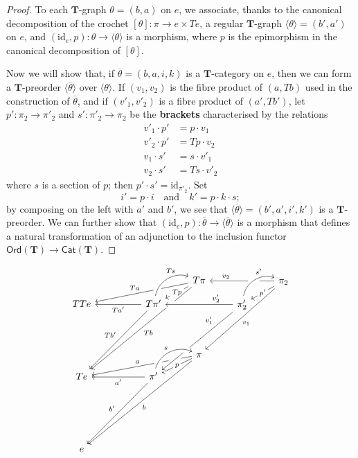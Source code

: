 \documentclass[fleqn]{article}
\newcommand{\oldpage}[1]{\marginpar{\footnotesize$\Big\vert$ \textit{p.~#1}}}
\newcommand{\unsure}[1]{{\color{purple}\textbf{#1}}}
\newcommand{\id}{\mathrm{id}}
\newcommand{\TT}{\mathbf{T}}
\newcommand{\textand}{\quad\text{and}\quad}
\newcommand{\Cat}[1]{\mathsf{#1}}
\newcommand{\Ord}[1]{\Cat{Ord}(#1)}
\begin{document}
\begin{proof}
  To each $\TT$-graph $\theta=(b,a)$ on $e$, we associate, thanks to the canonical decomposition of the crochet $[\theta]\colon\pi\to e\times Te$, a regular $\TT$-graph $\langle\theta\rangle=(b',a')$ on $e$, and $(\id_e,p)\colon\theta\to\langle\theta\rangle$ is a morphism, where $p$ is the epimorphism in the canonical decomposition of $[\theta]$.

  Now we will show that, if $\overline{\theta}=(b,a,i,k)$ is a $\TT$-category on $e$, then we can form a $\TT$-preorder $\langle\overline{\theta}\rangle$ over $\langle\theta\rangle$.
  If $(v_1,v_2)$ is the fibre product of $(a,Tb)$ used in the construction of $\overline{\theta}$, and if $(v'_1,v'_2)$ is a fibre product of $(a',Tb')$, let $p'\colon\pi_2\to\pi'_2$ and $s'\colon\pi'_2\to\pi_2$ be the \unsure{brackets} characterised by the relations
  \[
    \begin{aligned}
      v'_1\cdot p'
    & = p\cdot v_1
    \\v'_2\cdot p'
    & = Tp\cdot v_2
    \\v_1\cdot s'
    & = s\cdot v'_1
    \\v_2\cdot s'
    & = Ts\cdot v'_2
    \end{aligned}
  \]
  where $s$ is a section of $p$;
  then $p'\cdot s'=\id_{\pi'_2}$.
  Set
  \[
    i' = p\cdot i
    \textand
    k' = p\cdot k\cdot s;
  \]
  by composing on the left with $a'$ and $b'$, we see that $\langle\overline{\theta}\rangle=(b',a',i',k')$ is a $\TT$-preorder.
  \oldpage{240}
  We can further show that $(\id_e,p)\colon\overline{\theta}\to\langle\overline{\theta}\rangle$ is a morphism that defines a natural transformation of an adjunction to the inclusion functor $\Ord{\TT}\to\Cat{Cat}(\TT)$.
\end{proof}

\[
  \begin{tikzcd}
  &&&T\pi
      \ar[dlll,swap,"Ta"]
      \ar[dl,"Tp"description]
      \ar[dddlll,"Tb"]
  &&\pi_2
      \ar[ll,near end,swap,"v_2"]
      \ar[dl,"p'"description]
      \ar[ddll,"v_1"]
  \\[-1em]TTe
  && T\pi'
      \ar[ur,bend left=50,near end,"Ts",crossing over]
      \ar[ll,"Ta'"]
      \ar[ddll,swap,"Tb'"]
  &&\pi'_2
      \ar[ur,bend left=50,near end,"s'",crossing over]
      \ar[ll,near start,swap,"v'_2",crossing over]
  \\[2em]
  &&&\pi
      \ar[dlll,swap,"a"]
      \ar[dl,"p"description]
      \ar[dddlll,"b"]
  \\[-1em]Te
  && \pi'
      \ar[from=2-5,near start,swap,"v'_1",crossing over]
      \ar[ll,"a'"]
      \ar[ddll,swap,"b'"]
      \ar[ur,bend left=50,"s",crossing over]
  \\{}
  \\[2em]e
  \end{tikzcd}
\]
\end{document}
